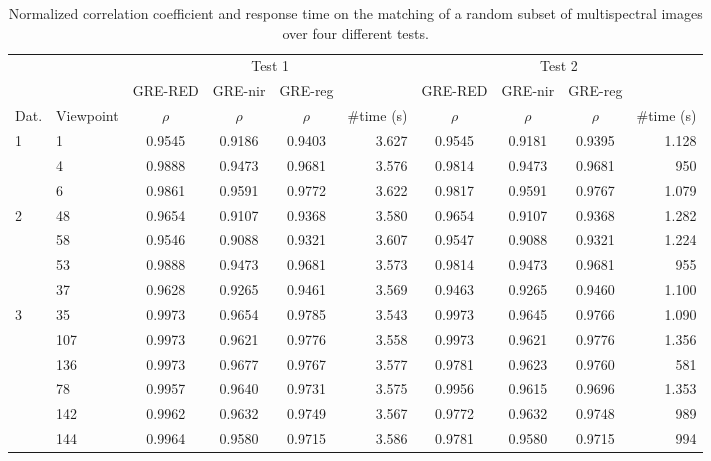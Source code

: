\renewcommand{\arraystretch}{1.2}
\begin{table}
    \footnotesize
    \caption{Normalized correlation coefficient and response time on the matching of a random subset of multispectral images over four different tests.}
    \label{table:multispectral_correlation_registration}
    \begin{tabular}{ll|cccr|cccr}
        \toprule
        \multicolumn{2}{c}{} & \multicolumn{4}{c}{Test 1} & \multicolumn{4}{c}{Test 2}\\
        \cmidrule{1-10}
        & & GRE-RED & GRE-\acrshort{nir} & GRE-\acrshort{reg} & & GRE-RED & GRE-\acrshort{nir} & GRE-\acrshort{reg}\\
        Dat. & Viewpoint & $\rho$ & $\rho$ & $\rho$ & \#time (\si{\second}) & $\rho$ & $\rho$ & $\rho$ & \#time (\si{\second}) \\
        \cmidrule{1-10}
        \multirow{3}{*}{1} & 1 & 0.9545 & 0.9186 & 0.9403 & 3.627 & 0.9545 & 0.9181 & 0.9395 & 1.128\\
        & 4 & 0.9888 & 0.9473 & 0.9681 & 3.576 & 0.9814 & 0.9473 & 0.9681 & 950\\
        & 6 & 0.9861 & 0.9591 & 0.9772 & 3.622 & 0.9817 & 0.9591 & 0.9767 & 1.079\\
        \cmidrule{1-10}
        \multirow{4}{*}{2} & 48 & 0.9654 & 0.9107 & 0.9368 & 3.580 & 0.9654 & 0.9107 & 0.9368 & 1.282\\
        & 58 & 0.9546 & 0.9088 & 0.9321 & 3.607 & 0.9547 & 0.9088 & 0.9321 & 1.224\\
        & 53 & 0.9888 & 0.9473 & 0.9681 & 3.573 & 0.9814 & 0.9473 & 0.9681 & 955\\
        & 37 & 0.9628 & 0.9265 & 0.9461 & 3.569 & 0.9463 & 0.9265 & 0.9460 & 1.100\\
        \cmidrule{1-10}
        \multirow{8}{*}{3} & 35 & 0.9973 & 0.9654 & 0.9785 & 3.543 & 0.9973 & 0.9645 & 0.9766 & 1.090\\
        & 107 & 0.9973 & 0.9621 & 0.9776 & 3.558 & 0.9973 & 0.9621 & 0.9776 & 1.356\\
        & 136 & 0.9973 & 0.9677 & 0.9767 & 3.577 & 0.9781 & 0.9623 & 0.9760 & 581\\
        & 78 & 0.9957 & 0.9640 & 0.9731 & 3.575 & 0.9956 & 0.9615 & 0.9696 & 1.353\\
        & 142 & 0.9962 & 0.9632 & 0.9749 & 3.567 & 0.9772 & 0.9632 & 0.9748 & 989\\
        & 144 & 0.9964 & 0.9580 & 0.9715 & 3.586 & 0.9781 & 0.9580 & 0.9715 & 994\\

\end{tabular}
\end{table}

